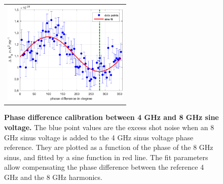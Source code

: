 \begin{figure}[hptb]
	\begin{center}
		\begin{tabular}{c}
			\includegraphics[width = 6cm]{./chap1/phase_calibration_8GHz}
		\end{tabular} 
	\end{center}
	\caption{\textbf{Phase difference calibration between 4 GHz and 8 GHz sine voltage.} The blue point values are the excess shot noise when an 8 GHz sinus voltage is added to the 4 GHz sinus voltage phase reference. They are plotted as a function of the phase of the 8 GHz sinus, and fitted by a sine function in red line. The fit parameters allow compensating the phase difference between the reference 4 GHz and the 8 GHz harmonics.}
	\label{fig: phase calibration}
\end{figure}

